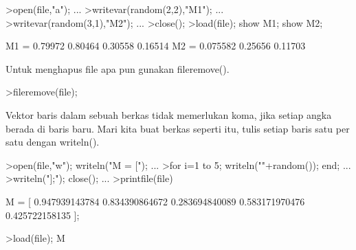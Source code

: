 \documentclass[a4paper,10pt]{article}
\begin{document}
\begin{eulernotebook}
\begin{eulercomment}
\begin{eulercomment}
\begin{eulercomment}
\begin{eulercomment}
\begin{eulercomment}
\begin{eulercomment}
\begin{eulercomment}
\begin{eulercomment}
\begin{eulercomment}
\begin{eulercomment}
\begin{eulercomment}
\begin{eulercomment}
\begin{eulercomment}
\begin{eulercomment}
\begin{eulercomment}
\begin{eulercomment}
\begin{eulercomment}
\begin{eulercomment}
\begin{eulercomment}
\begin{eulercomment}
\begin{eulercomment}
\begin{eulercomment}
\begin{eulercomment}
\begin{eulercomment}
\begin{eulercomment}
\begin{eulercomment}
\begin{eulercomment}
\begin{eulercomment}
\begin{eulercomment}
\begin{eulercomment}
\begin{eulercomment}
\begin{eulercomment}
\begin{eulercomment}
\begin{eulercomment}
\begin{eulercomment}
\begin{eulercomment}
\begin{eulerprompt}
>open(file,"a"); ...
>writevar(random(2,2),"M1"); ...
>writevar(random(3,1),"M2"); ...
>close();
>load(file); show M1; show M2;
\end{eulerprompt}
\begin{euleroutput}
  M1 = 
    0.79972   0.80464 
    0.30558   0.16514 
  M2 = 
   0.075582 
    0.25656 
    0.11703 
\end{euleroutput}
\begin{eulercomment}
Untuk menghapus file apa pun gunakan fileremove().
\end{eulercomment}
\begin{eulerprompt}
>fileremove(file);
\end{eulerprompt}
\begin{eulercomment}
Vektor baris dalam sebuah berkas tidak memerlukan koma, jika setiap
angka berada di baris baru. Mari kita buat berkas seperti itu, tulis
setiap baris satu per satu dengan writeln().
\end{eulercomment}
\begin{eulerprompt}
>open(file,"w"); writeln("M = ["); ...
>for i=1 to 5; writeln(""+random()); end; ...
>writeln("];"); close(); ...
>printfile(file)
\end{eulerprompt}
\begin{euleroutput}
  M = [
  0.947939143784
  0.834390864672
  0.283694840089
  0.583171970476
  0.425722158135
  ];
\end{euleroutput}
\begin{eulerprompt}
>load(file); M
\end{eulerprompt}
\begin{euleroutput}
  [0.94794,  0.83439,  0.28369,  0.58317,  0.42572]
\end{euleroutput}
\begin{eulercomment}

\end{eulercomment}
\end{eulercomment}
\end{eulercomment}
\end{eulercomment}
\end{eulercomment}
\end{eulercomment}
\end{eulercomment}
\end{eulercomment}
\end{eulercomment}
\end{eulercomment}
\end{eulercomment}
\end{eulercomment}
\end{eulercomment}
\end{eulercomment}
\end{eulercomment}
\end{eulercomment}
\end{eulercomment}
\end{eulercomment}
\end{eulercomment}
\end{eulercomment}
\end{eulercomment}
\end{eulercomment}
\end{eulercomment}
\end{eulercomment}
\end{eulercomment}
\end{eulercomment}
\end{eulercomment}
\end{eulercomment}
\end{eulercomment}
\end{eulercomment}
\end{eulercomment}
\end{eulercomment}
\end{eulercomment}
\end{eulercomment}
\end{eulercomment}
\end{eulercomment}
\end{eulercomment}
\end{eulernotebook}
\end{document}
